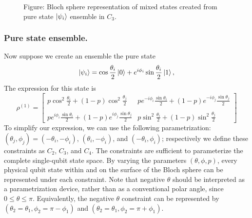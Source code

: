 \documentclass[../../../main.tex]{subfiles}
\begin{document}
\begin{figure}
  \caption*{Figure: Bloch sphere representation of mixed states created from pure state $\ket{\psi_i}$ ensemble in $C_3$.}
  \label{fig:chain}
\end{figure}

\subsubsection{Pure state ensemble.}
Now suppose we create an ensemble the pure state
\begin{equation*}
  \ket{\psi_i}
  =
  \cos\frac{\theta_i}{2}\ket{0}
  +
  e^{i\phi_i}\sin\frac{\theta_i}{2}\ket{1},
\end{equation*}
The expression for this state is
\begin{equation*}
  \rho^{(1)}  =
  \begin{bmatrix}
    p\cos^2\frac{\theta_i}{2}
    +(1-p)\cos^2\frac{\theta_j}{2}
     &
    p e^{-i\phi_i}\frac{\sin \theta_i}{2}
    +(1-p)e^{-i\phi_j}\frac{\sin \theta_j}{2}
    \\\\
    p e^{i\phi_i}\frac{\sin \theta_i}{2}
    +(1-p)e^{i\phi_j}\frac{\sin \theta_j}{2}
     &
    p\sin^2\frac{\theta_i}{2}
    +(1-p)\sin^2\frac{\theta_j}{2}
  \end{bmatrix}
\end{equation*}
To simplify our expression, we can use the following parametrization: \((\theta_j,\phi_j)=(-\theta_i,-\phi_i)\), \((\theta_i,-\phi_i)\), and \((-\theta_i,\phi_i)\); respectively we define these constraints as $C_2$, $C_3$, and $C_4$.
The constraints are sufficient to parameterize the complete single-qubit state space.
By varying the parameters $(\theta,\phi,p)$, every physical qubit state within and on the surface of the Bloch sphere can be represented under each constraint.
Note that negative \(\theta\) should be interpreted as a parametrization device, rather than as a conventional polar angle, since $0 \leq \theta \leq \pi$.
Equivalently, the negative $\theta$ constraint can be represented by $(\theta_2=\theta_1,\phi_2 = \pi-\phi_1)$ and $(\theta_2=\theta_1,\phi_2 = \pi+\phi_1)$.
\end{document}
